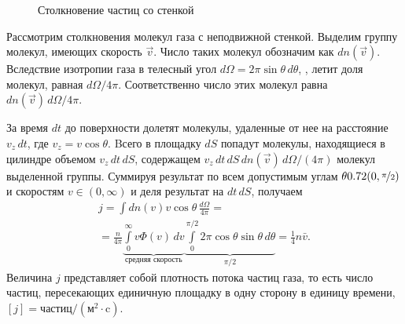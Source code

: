 \begin{wrapfigure}[9]{r}{0.35\tw}
    \vspace{-1pc}
    \centering
    \caption{Столкновение частиц со стенкой}
    \label{pic:maxwell-mean-particle-collision}
\end{wrapfigure}
Рассмотрим столкновения молекул газа с неподвижной стенкой. Выделим группу молекул, имеющих скорость $\vec v$. Число таких молекул обозначим как $d n(\vec{v})$. Вследствие изотропии газа в телесный угол $d \Omega = 2 \pi \sin \theta \, d \theta$, , летит доля молекул, равная $d \Omega / 4 \pi$. Соответственно число этих молекул равна $dn(\vec{v}) \, d \Omega / 4 \pi$. 

За время $dt$ до поверхности долетят молекулы, удаленные от нее на расстояние $v_z \, dt$, где $v_z = v \cos \theta$. Bсего в площадку $dS$ попадут молекулы, находящиеся в цилиндре объемом $v_z \, dt \, dS$, содержащем $v_z \, dt \, dS \, dn(\vec{v}) \, d\Omega / (4 \pi)$ молекул выделенной группы. Суммируя результат по всем допустимым углам $\theta \in (0, \nicefrac{\pi}{2})$ и скоростям $v \in (0, \infty)$ и деля результат на $d t \, d S$, получаем
\begin{multline}
    j 
        = \int d n(v) v \cos \theta \, \frac{d \Omega}{4 \pi} = \\
        = \frac{n}{4 \pi} \underbrace{\int\limits_0^{\infty} v \Phi(v) \, d v}_{\text{средняя скорость}} \underbrace{\int\limits_0^{\pi / 2} 2 \pi \cos \theta  \sin \theta \, d \theta}_{\pi / 2}
        = \frac{1}{4} n \bar{v} .
    \label{eq:mean-count-mxwl}
\end{multline}
Величина $j$ представляет собой плотность потока частиц газа, то есть число частиц, пересекающих единичную площадку в одну сторону в единицу времени, $[j]= \text{частиц}/\left(\text{м}^2 \cdot \text{c}\right)$.


